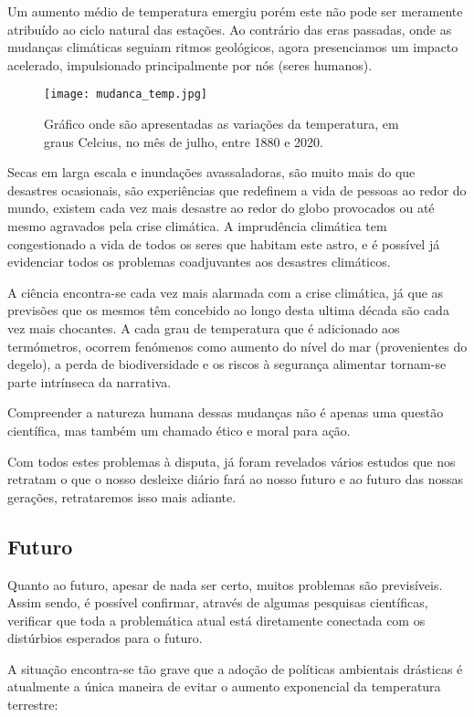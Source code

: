 \documentclass{report}
\begin{document}
Um aumento médio de temperatura emergiu porém este não pode ser meramente atribuído ao ciclo natural das estações. Ao contrário das eras passadas, onde as mudanças climáticas seguiam ritmos geológicos, agora presenciamos um impacto acelerado, impulsionado principalmente por nós (seres humanos). 

\begin{figure}[H]
	\centering
	\texttt{[image: mudanca\_temp.jpg]}
	\caption{Gráfico onde são apresentadas as variações da temperatura, em graus Celcius, no mês de julho, entre 1880 e 2020.}
	\label{fig:mudancas_da_temperatura}
\end{figure}

Secas em larga escala e inundações avassaladoras, são muito mais do que desastres ocasionais, são experiências que redefinem a vida de pessoas ao redor do mundo, existem cada vez mais desastre ao redor do globo provocados ou até mesmo agravados pela crise climática. A imprudência climática tem congestionado a vida de todos os seres que habitam este astro, e é possível já evidenciar todos os problemas coadjuvantes aos desastres climáticos.

A ciência encontra-se cada vez mais alarmada com a crise climática, já que as previsões que os mesmos têm concebido ao longo desta ultima década são cada vez mais chocantes. A cada grau de temperatura que é adicionado aos termómetros, ocorrem fenómenos como aumento do nível do mar (provenientes do degelo), a perda de biodiversidade e os riscos à segurança alimentar tornam-se parte intrínseca da narrativa. 

Compreender a natureza humana dessas mudanças não é apenas uma questão científica, mas também um chamado ético e moral para ação. 

Com todos estes problemas à disputa, já foram revelados vários estudos que nos retratam o que o nosso desleixe diário fará ao nosso futuro e ao futuro das nossas gerações, retrataremos isso mais adiante.

\subsection{Futuro}

Quanto ao futuro, apesar de nada ser certo, muitos problemas são previsíveis. Assim sendo, é possível confirmar, através de algumas pesquisas científicas, verificar que toda a problemática atual está diretamente conectada com os distúrbios esperados para o futuro.

A situação encontra-se tão grave que a adoção de políticas ambientais drásticas é atualmente a única maneira de evitar o aumento exponencial da temperatura terrestre:
\end{document}
